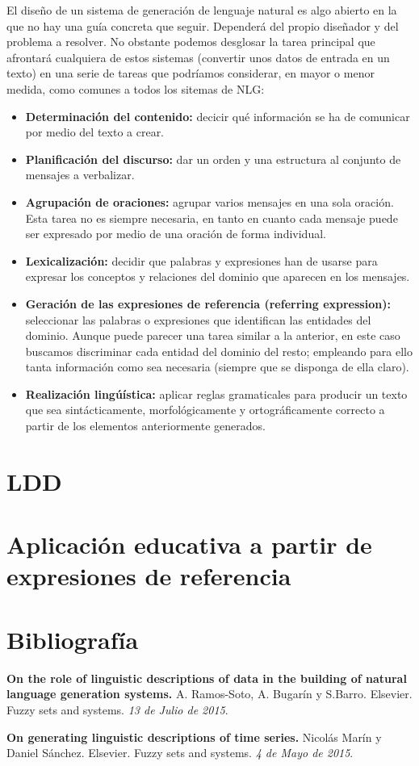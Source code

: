 \documentclass[10pt,a4paper]{article}
\begin{document}
El diseño de un sistema de generación de lenguaje natural es algo abierto en la que no hay una guía concreta que seguir. Dependerá del propio diseñador y del problema a resolver. No obstante podemos desglosar la tarea principal que afrontará cualquiera de estos sistemas (convertir unos datos de entrada en un texto) en una serie de tareas que podríamos considerar, en mayor o menor medida, como comunes a todos los sitemas de NLG:

\begin{itemize}
\item \textbf{Determinación del contenido:} decicir qué información se ha de comunicar por medio del texto a crear.
\item \textbf{Planificación del discurso:} dar un orden y una estructura al conjunto de mensajes a verbalizar.
\item \textbf{Agrupación de oraciones:} agrupar varios mensajes en una sola oración. Esta tarea no es siempre necesaria, en tanto en cuanto cada mensaje puede ser expresado por medio de una oración de forma individual.
\item \textbf{Lexicalización:} decidir que palabras y expresiones han de usarse para expresar los conceptos y relaciones del dominio que aparecen en los mensajes.
\item \textbf{Geración de las expresiones de referencia (referring expression):} seleccionar las palabras o expresiones que identifican las entidades del dominio. Aunque puede parecer una tarea similar a la anterior, en este caso buscamos discriminar cada entidad del dominio del resto; empleando para ello tanta información como sea necesaria (siempre que se disponga de ella claro).
\item \textbf{Realización lingúística:} aplicar reglas gramaticales para producir un texto que sea sintácticamente, morfológicamente y ortográficamente correcto a partir de los elementos anteriormente generados.
\end{itemize}

\section{LDD}


\section{Aplicación educativa a partir de expresiones de referencia}

\newpage

\section{Bibliografía}
\begin{enumerate}[{[}1{]}]
\item \textbf{On the role of linguistic descriptions of data in the building of natural language generation systems.} A. Ramos-Soto, A. Bugarín y S.Barro. Elsevier. Fuzzy sets and systems. \textit{13 de Julio de 2015}.
\item \textbf{On generating linguistic descriptions of time series.} Nicolás Marín y Daniel Sánchez. Elsevier. Fuzzy sets and systems. \textit{4 de Mayo de 2015}.
\end{enumerate}
\end{document}

